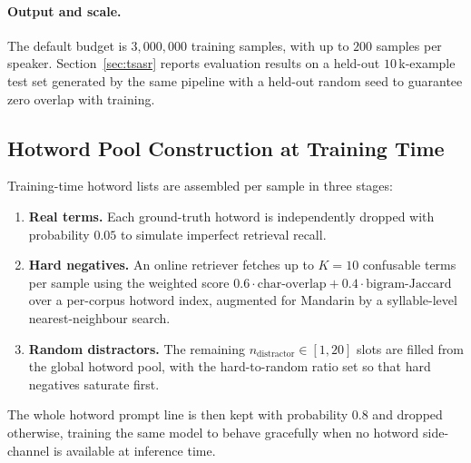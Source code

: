 \paragraph{Output and scale.}
The default budget is $3{,}000{,}000$ training samples, with up to
$200$ samples per speaker. Section~\ref{sec:tsasr} reports
evaluation results on a held-out $10\,$k-example test set generated by
the same pipeline with a held-out random seed to guarantee zero
overlap with training.

\subsection{Hotword Pool Construction at Training Time}
\label{subsec:hotword-pool}

Training-time hotword lists are assembled per sample in three stages:

\begin{enumerate}
  \item \textbf{Real terms.} Each ground-truth hotword is
        independently dropped with probability $0.05$ to simulate
        imperfect retrieval recall.
  \item \textbf{Hard negatives.} An online retriever fetches up to
        $K\!=\!10$ confusable terms per sample using the weighted
        score $0.6\cdot\text{char-overlap} +
        0.4\cdot\text{bigram-Jaccard}$ over a per-corpus hotword
        index, augmented for Mandarin by a syllable-level
        nearest-neighbour search.
  \item \textbf{Random distractors.} The remaining
        $n_\text{distractor}\!\in\![1, 20]$ slots are filled from the
        global hotword pool, with the hard-to-random ratio set so
        that hard negatives saturate first.
\end{enumerate}

The whole hotword prompt line is then kept with probability $0.8$
and dropped otherwise, training the same model to behave gracefully
when no hotword side-channel is available at inference time.

